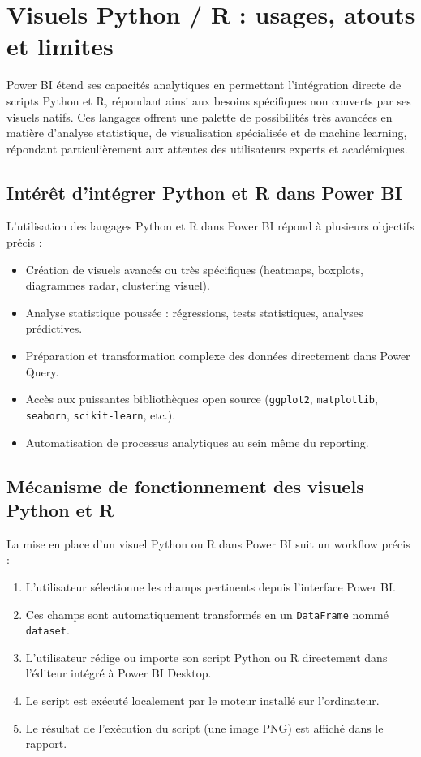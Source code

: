 
\section{Visuels Python / R : usages, atouts et limites}
\label{sec:visuels-python-r}

Power BI étend ses capacités analytiques en permettant l’intégration directe de scripts Python et R, répondant ainsi aux besoins spécifiques non couverts par ses visuels natifs. Ces langages offrent une palette de possibilités très avancées en matière d'analyse statistique, de visualisation spécialisée et de machine learning, répondant particulièrement aux attentes des utilisateurs experts et académiques.

\subsection{Intérêt d’intégrer Python et R dans Power BI}

L'utilisation des langages Python et R dans Power BI répond à plusieurs objectifs précis :
\begin{itemize}
\item Création de visuels avancés ou très spécifiques (heatmaps, boxplots, diagrammes radar, clustering visuel).
\item Analyse statistique poussée : régressions, tests statistiques, analyses prédictives.
\item Préparation et transformation complexe des données directement dans Power Query.
\item Accès aux puissantes bibliothèques open source (\texttt{ggplot2}, \texttt{matplotlib}, \texttt{seaborn}, \texttt{scikit-learn}, etc.).
\item Automatisation de processus analytiques au sein même du reporting.
\end{itemize}

\subsection{Mécanisme de fonctionnement des visuels Python et R}

La mise en place d’un visuel Python ou R dans Power BI suit un workflow précis :
\begin{enumerate}
\item L’utilisateur sélectionne les champs pertinents depuis l’interface Power BI.
\item Ces champs sont automatiquement transformés en un \texttt{DataFrame} nommé \texttt{dataset}.
\item L’utilisateur rédige ou importe son script Python ou R directement dans l’éditeur intégré à Power BI Desktop.
\item Le script est exécuté localement par le moteur installé sur l'ordinateur.
\item Le résultat de l’exécution du script (une image PNG) est affiché dans le rapport.
\end{enumerate}

